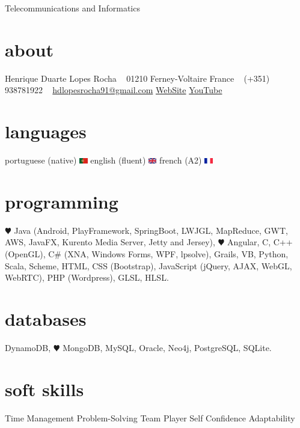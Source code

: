 \documentclass[]{friggeri-cv}
\begin{document}
       {Telecommunications and Informatics}

\begin{aside}
  \section{about}
    Henrique Duarte Lopes Rocha
    ~
    01210 Ferney-Voltaire
    France
    ~
    (+351) 938781922
    ~
    \href{mailto:hdlopesrocha91@gmail.com}{hdlopesrocha91@gmail.com}
    \href{http://web.ist.utl.pt/ist168621}{WebSite}
    \href{http://www.youtube.com/user/hdlopesrocha}{YouTube}
  \section{languages}
    portuguese (native) \includegraphics[width=10pt]{pt}
    english (fluent) \includegraphics[width=10pt]{uk}
    french (A2) \includegraphics[width=10pt]{fr}
  \section{programming}
    {\color{red} $\varheartsuit$} Java
	(Android, PlayFramework, SpringBoot, LWJGL, MapReduce, GWT, AWS, JavaFX, Kurento Media Server, Jetty and Jersey), 
	{\color{yellow} $\varheartsuit$} Angular, C, C++ (OpenGL), C\# (XNA, Windows Forms, WPF, lpsolve), Grails, VB, Python, Scala, Scheme, 
	HTML, CSS (Bootstrap), JavaScript (jQuery, AJAX, WebGL, WebRTC), PHP (Wordpress), GLSL, HLSL.
\section{databases}
	DynamoDB, {\color{green} $\varheartsuit$} MongoDB, MySQL, Oracle, Neo4j, PostgreSQL, SQLite.
   \section{soft skills}
	Time Management
	Problem-Solving
	Team Player
	Self Confidence
	Adaptability
\end{aside}
\end{document}
